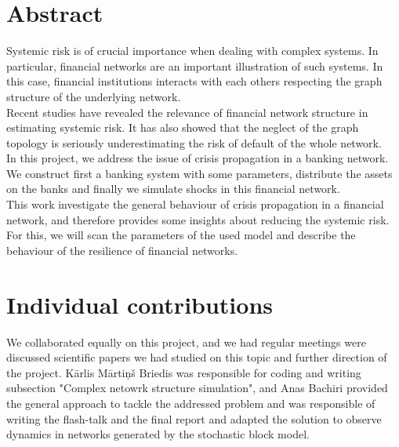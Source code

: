\documentclass[14pt]{article}
\begin{document}
\section{Abstract}
Systemic risk is of crucial importance when dealing with complex systems. In particular, financial networks are an important illustration of such systems. In this case, financial institutions interacts with each others respecting the graph structure of the underlying network. 
\\ Recent studies \cite{art2} have revealed the relevance of financial network structure in estimating systemic risk. It has also showed that the neglect of the graph topology is seriously underestimating the risk of default of the whole network.
\\ In this project, we address the issue of crisis propagation in a banking network. We construct first a banking system with some parameters, distribute the assets on the banks  and finally we simulate shocks in this financial network.
\\ This work investigate the general behaviour of crisis propagation in a financial network, and therefore provides some insights about reducing the systemic risk. For this, we will scan the parameters of the used model and describe the behaviour of the resilience of financial networks.
\vspace{65mm}

\section{Individual contributions}


We collaborated equally on this project, and we had regular meetings were discussed scientific papers we had studied on this topic and further direction of the project.
K\={a}rlis M\={a}rti\c{n}\v{s} Briedis was responsible for coding and writing subsection "Complex netowrk structure simulation", and Anas Bachiri provided the general approach to tackle the addressed problem and was responsible of writing the flash-talk and the final report and adapted the solution to observe dynamics in networks generated by the stochastic block model.
\end{document}
